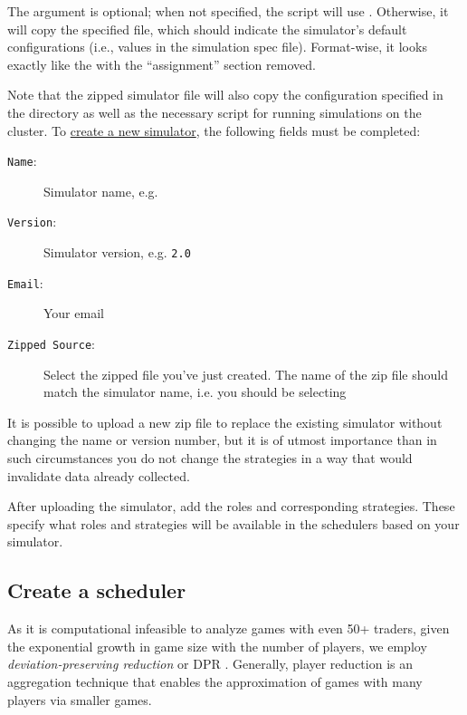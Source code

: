 \documentclass[11pt]{article}
\begin{document}
The  argument is optional; when not specified, the script will use . Otherwise, it will copy the specified file, which should indicate the simulator's default configurations (i.e., values in the simulation spec file).
Format-wise, it looks exactly like the  with the ``assignment'' section removed.

Note that the zipped simulator file will also copy the configuration specified in the  directory as well as the necessary  script for running simulations on the cluster.
To \href{http://egtaonline.eecs.umich.edu/simulators/new}{create a new simulator}, the following fields must be completed:
\begin{description}
\item[\texttt{Name}:] Simulator name, e.g. 
\item[\texttt{Version}:] Simulator version, e.g. \verb|2.0|
\item[\texttt{Email}:] Your email
\item[\texttt{Zipped Source}:] Select the zipped file you've just created. The name of the zip file should match the simulator name, i.e. you should be selecting 
\end{description}
It is possible to upload a new zip file to replace the existing simulator without changing the name or version number, but it is of utmost importance than in such circumstances you do not change the strategies in a way that would invalidate data already collected.

After uploading the simulator, add the roles and corresponding strategies. These specify what roles and strategies will be available in the schedulers based on your simulator.

\subsection{Create a scheduler}

As it is computational infeasible to analyze games with even 50+ traders, given the exponential growth in game size with the number of players, we employ \emph{deviation-preserving reduction} or DPR \citep{Wiedenbeck2012}.
Generally, player reduction is an aggregation technique that enables the approximation of games with many players via smaller games.
\end{document}
